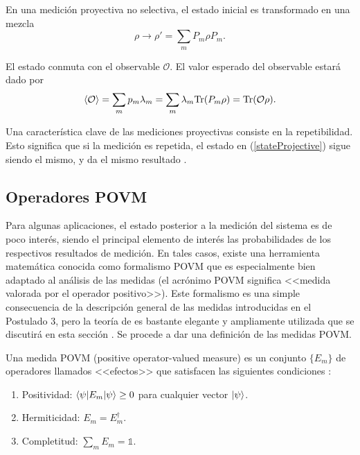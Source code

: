  En una medición proyectiva no selectiva, el estado inicial es transformado en
una mezcla  
\begin{equation}
	\rho \to \rho'=\sum_m P_m \rho P_m.
\end{equation} 


El estado conmuta con el observable $\mathcal{O}$. El valor esperado del
observable estará dado por 
\begin{equation}
	\langle \mathcal{O} \rangle=\sum_m p_m\lambda_m=\sum_m \lambda_m
{\rm Tr}(P_m\rho)={\rm Tr}(\mathcal{O}\rho).
\end{equation}

Una característica clave de las mediciones proyectivas consiste en la
repetibilidad. Esto significa que si la medición es repetida, el estado en
({\ref{stateProjective}}) sigue siendo el mismo, y da el mismo resultado
{\cite{2007geometry}}.
\subsection{Operadores POVM}\label{operadoresPOVM} %
Para algunas aplicaciones, el estado posterior a la medición del sistema es de poco interés, siendo el
principal elemento de interés las probabilidades de los respectivos resultados
de medición. En tales casos, existe una herramienta matemática conocida como
formalismo POVM que es especialmente bien adaptado al análisis de las medidas
(el acrónimo POVM significa <<medida valorada por el operador positivo>>). Este
formalismo es una simple consecuencia de la descripción general de las medidas
introducidas en el Postulado 3, pero la teoría de es bastante elegante y
ampliamente utilizada que se discutirá en esta sección
{\cite{nielsen_chuang_2010}}. Se procede a dar una definición de las medidas
POVM\@. 

\begin{definition} Una medida POVM (positive operator-valued measure) es un conjunto $\{E_{m}\}$ de operadores llamados <<efectos>> que satisfacen las siguientes condiciones {\cite{2007geometry}}:
	\begin{enumerate}
		\item Positividad: $\langle \psi |E_m|\psi \rangle \ge 0 $ para cualquier vector $|\psi\rangle$.
		\item Hermiticidad: $E_m=E_{m}^\dagger$.
		\item  Completitud: $\sum_m E_m =\mathds{1}$.
	\end{enumerate}
\end{definition}

